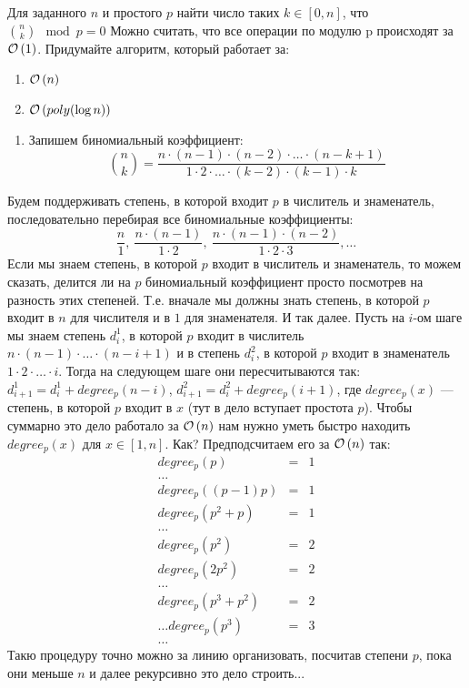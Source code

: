 \begin{task}[2]
Для заданного $n$ и простого $p$ найти число таких $k \in [0, n]$, что ${n \choose k} \mod{p} = 0$
Можно считать, что все операции по модулю p происходят за $\mathcal{O}\left(1\right)$. Придумайте алгоритм, который работает за:
	\begin{enumerate}[label=(\alph*)]
		\item $\mathcal{O}\left(n\right)$
		\item $\mathcal{O}\left(poly{(\log{n})}\right)$
	\end{enumerate}
\end{task}
\begin{solution}

\begin{enumerate}[label=(\alph*)]
	\item Запишем биномиальный коэффициент: 
	\[ 
		{n \choose k} = \frac{n\cdot(n-1)\cdot(n-2)\cdot \ldots \cdot (n-k+1)}{1\cdot2\cdot\ldots\cdot(k-2)\cdot(k-1)\cdot k}
	\]
\end{enumerate}
Будем поддерживать степень, в которой входит $p$ в числитель и знаменатель, последовательно перебирая все биномиальные коэффициенты:
\[
	\frac{n}{1},\ \frac{n\cdot(n-1)}{1\cdot2},\ \frac{n\cdot(n-1)\cdot(n-2)}{1\cdot2\cdot3}, \ldots
\]
Если мы знаем степень, в которой $p$ входит в числитель и знаменатель, то можем сказать, делится ли на $p$ биномиальный коэффициент просто посмотрев на разность этих степеней.
Т.е. вначале мы должны знать степень, в которой $p$ входит в $n$ для числителя и в $1$ для знаменателя. И так далее. Пусть на $i$-ом шаге мы знаем степень $d^1_i$, в которой $p$ входит в числитель $n\cdot(n-1)\cdot\ldots\cdot(n-i+1)$ и в степень $d^2_i$, в которой $p$ входит в знаменатель $1\cdot2\cdot\ldots \cdot i$. Тогда на следующем шаге они пересчитываются так: $d^1_{i+1} = d^1_i + degree_p(n - i)$, $d^2_{i+1} = d^2_i + degree_p(i + 1)$, где $degree_p(x)$ --- степень, в которой $p$ входит в $x$ (тут в дело вступает простота $p$). Чтобы суммарно это дело работало за $\mathcal{O}\left(n\right)$ нам нужно уметь быстро находить $degree_p(x)$ для $x \in [1, n]$. Как? Предподсчитаем его за $\mathcal{O}\left(n\right)$ так:
\[
	\begin{array}{lcl}
		degree_p(p)  & = & 1\\
		\ldots\\
		degree_p((p-1)p) & = & 1\\
		degree_p(p^2 + p) & = & 1 \\
		\ldots\\
		degree_p(p^2) & = & 2 \\
		degree_p(2p^2) & = & 2 \\
		\ldots\\
		degree_p(p^3 + p^2) & = & 2\\
		\ldots
		degree_p(p^3) & = & 3\\
		\ldots
	\end{array}
\] 
Такю процедуру точно можно за линию организовать, посчитав степени $p$, пока они меньше $n$ и далее рекурсивно это дело строить...
\xqed
\end{solution}

